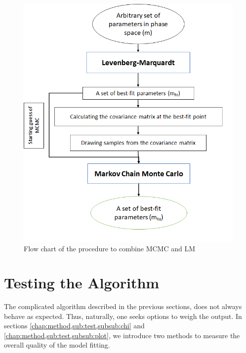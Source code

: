 \documentclass[12pt, TexShade, letterpaper]{report}
\begin{document}
\begin{figure}[h!]
\centering
\includegraphics[scale =0.9]{combined_flow.png}
\caption{Flow chart of the procedure to combine MCMC and LM}
\label{fig:combined_flow}
\end{figure}
\section{Testing the Algorithm}
The complicated algorithm described in the previous sections, does not always behave as expected. Thus, naturally, one seeks options to weigh the output. In sections \ref{chap:method,sub:test,subsub:chi} and \ref{chap:method,sub:test,subsub:plot}, we introduce two methods to measure the overall quality of the model fitting.\par
\end{document}
